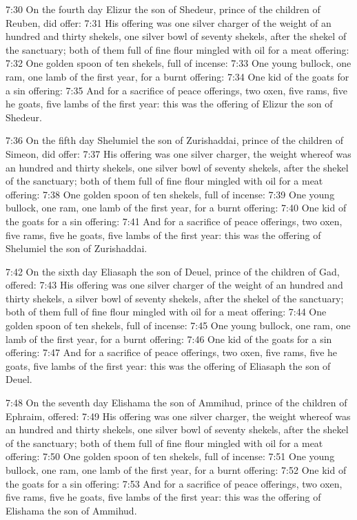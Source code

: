 7:30 On the fourth day Elizur the son of Shedeur, prince of the children of Reuben, did offer: 7:31 His offering was one silver charger of the weight of an hundred and thirty shekels, one silver bowl of seventy shekels, after the shekel of the sanctuary; both of them full of fine flour mingled with oil for a meat offering: 7:32 One golden spoon of ten shekels, full of incense: 7:33 One young bullock, one ram, one lamb of the first year, for a burnt offering: 7:34 One kid of the goats for a sin offering: 7:35 And for a sacrifice of peace offerings, two oxen, five rams, five he goats, five lambs of the first year: this was the offering of Elizur the son of Shedeur.

7:36 On the fifth day Shelumiel the son of Zurishaddai, prince of the children of Simeon, did offer: 7:37 His offering was one silver charger, the weight whereof was an hundred and thirty shekels, one silver bowl of seventy shekels, after the shekel of the sanctuary; both of them full of fine flour mingled with oil for a meat offering: 7:38 One golden spoon of ten shekels, full of incense: 7:39 One young bullock, one ram, one lamb of the first year, for a burnt offering: 7:40 One kid of the goats for a sin offering: 7:41 And for a sacrifice of peace offerings, two oxen, five rams, five he goats, five lambs of the first year: this was the offering of Shelumiel the son of Zurishaddai.

7:42 On the sixth day Eliasaph the son of Deuel, prince of the children of Gad, offered: 7:43 His offering was one silver charger of the weight of an hundred and thirty shekels, a silver bowl of seventy shekels, after the shekel of the sanctuary; both of them full of fine flour mingled with oil for a meat offering: 7:44 One golden spoon of ten shekels, full of incense: 7:45 One young bullock, one ram, one lamb of the first year, for a burnt offering: 7:46 One kid of the goats for a sin offering: 7:47 And for a sacrifice of peace offerings, two oxen, five rams, five he goats, five lambs of the first year: this was the offering of Eliasaph the son of Deuel.

7:48 On the seventh day Elishama the son of Ammihud, prince of the children of Ephraim, offered: 7:49 His offering was one silver charger, the weight whereof was an hundred and thirty shekels, one silver bowl of seventy shekels, after the shekel of the sanctuary; both of them full of fine flour mingled with oil for a meat offering: 7:50 One golden spoon of ten shekels, full of incense: 7:51 One young bullock, one ram, one lamb of the first year, for a burnt offering: 7:52 One kid of the goats for a sin offering: 7:53 And for a sacrifice of peace offerings, two oxen, five rams, five he goats, five lambs of the first year: this was the offering of Elishama the son of Ammihud.

